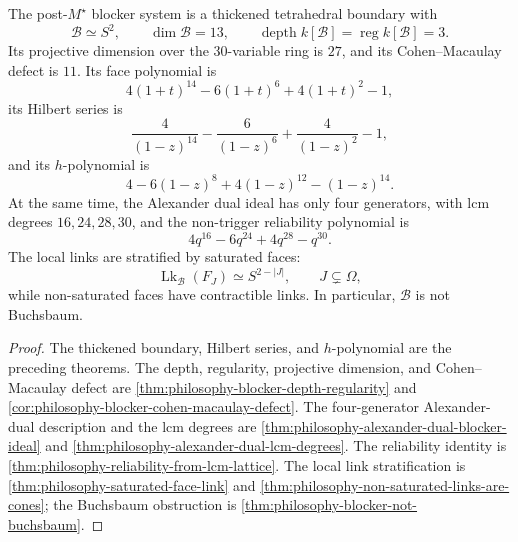 \begin{theorem}
\label{thm:philosophy-hilbert-alexander-structure-theorem}
The post-$M^{\star}$ blocker system is a thickened tetrahedral
boundary with
$$
  \mathcal{B}\simeq S^{2},
  \qquad
  \dim\mathcal{B}=13,
  \qquad
  \operatorname{depth}k[\mathcal{B}]
  =
  \operatorname{reg}k[\mathcal{B}]
  =
  3.
$$
Its projective dimension over the $30$-variable ring is $27$, and its
Cohen--Macaulay defect is $11$.
Its face polynomial is
$$
  4(1+t)^{14}-6(1+t)^{6}+4(1+t)^{2}-1,
$$
its Hilbert series is
$$
  \frac{4}{(1-z)^{14}}
  -
  \frac{6}{(1-z)^{6}}
  +
  \frac{4}{(1-z)^{2}}
  -
  1,
$$
and its $h$-polynomial is
$$
  4-6(1-z)^{8}+4(1-z)^{12}-(1-z)^{14}.
$$
At the same time, the Alexander dual ideal has only four generators,
with lcm degrees $16,24,28,30$, and the non-trigger reliability
polynomial is
$$
  4q^{16}-6q^{24}+4q^{28}-q^{30}.
$$
The local links are stratified by saturated faces:
$$
  \operatorname{Lk}_{\mathcal{B}}(F_{J})
  \simeq
  S^{2-|J|},
  \qquad
  J\subsetneq\Omega,
$$
while non-saturated faces have contractible links. In particular,
$\mathcal{B}$ is not Buchsbaum.
\end{theorem}
\begin{proof}
The thickened boundary, Hilbert series, and $h$-polynomial are the
preceding theorems. The depth, regularity, projective dimension, and
Cohen--Macaulay defect are
\autoref{thm:philosophy-blocker-depth-regularity} and
\autoref{cor:philosophy-blocker-cohen-macaulay-defect}. The
four-generator Alexander-dual description and the lcm degrees are
\autoref{thm:philosophy-alexander-dual-blocker-ideal} and
\autoref{thm:philosophy-alexander-dual-lcm-degrees}. The reliability
identity is \autoref{thm:philosophy-reliability-from-lcm-lattice}. The
local link stratification is
\autoref{thm:philosophy-saturated-face-link} and
\autoref{thm:philosophy-non-saturated-links-are-cones}; the Buchsbaum
obstruction is \autoref{thm:philosophy-blocker-not-buchsbaum}.
\end{proof}
